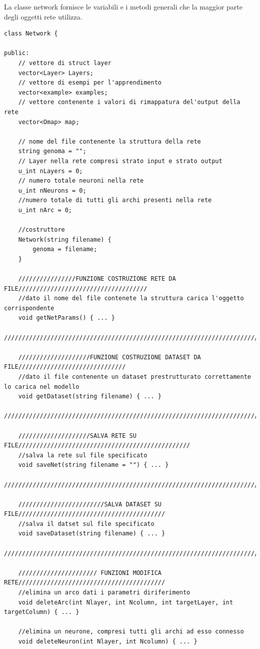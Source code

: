 \documentclass[10pt,a4paper]{article}
\begin{document}
La classe network fornisce le variabili e i metodi generali che la maggior parte degli oggetti rete utilizza. 
\begin{lstlisting}[style=mycuda, caption=class Network, captionpos=b]
class Network {

public:
	// vettore di struct layer
	vector<Layer> Layers; 
	// vettore di esempi per l'apprendimento
	vector<example> examples; 
	// vettore contenente i valori di rimappatura del'output della rete
	vector<Omap> map; 

	// nome del file contenente la struttura della rete
	string genoma = ""; 
	// Layer nella rete compresi strato input e strato output
	u_int nLayers = 0; 
	// numero totale neuroni nella rete
	u_int nNeurons = 0; 
	//numero totale di tutti gli archi presenti nella rete
	u_int nArc = 0;
	
	//costruttore
	Network(string filename) {
		genoma = filename;
	}

	////////////////FUNZIONE COSTRUZIONE RETE DA FILE////////////////////////////////////
	//dato il nome del file contenete la struttura carica l'oggetto corrispondente
	void getNetParams() { ... }
	//////////////////////////////////////////////////////////////////////////////////////
	
	////////////////////FUNZIONE COSTRUZIONE DATASET DA FILE//////////////////////////////
	//dato il file contenente un dataset prestrutturato correttamente lo carica nel modello
	void getDataset(string filename) { ... }
	//////////////////////////////////////////////////////////////////////////////////////
	
	////////////////////SALVA RETE SU FILE////////////////////////////////////////////////
	//salva la rete sul file specificato
	void saveNet(string filename = "") { ... }
	//////////////////////////////////////////////////////////////////////////////////////
	
	////////////////////////SALVA DATASET SU FILE/////////////////////////////////////////
	//salva il datset sul file specificato
	void saveDataset(string filename) { ... }
	//////////////////////////////////////////////////////////////////////////////////////
	
	////////////////////// FUNZIONI MODIFICA RETE/////////////////////////////////////////
	//elimina un arco dati i parametri diriferimento
	void deleteArc(int Nlayer, int Ncolumn, int targetLayer, int targetColumn) { ... }
	
	//elimina un neurone, compresi tutti gli archi ad esso connesso
	void deleteNeuron(int Nlayer, int Ncolumn) { ... }
	

\end{lstlisting}
\end{document}
